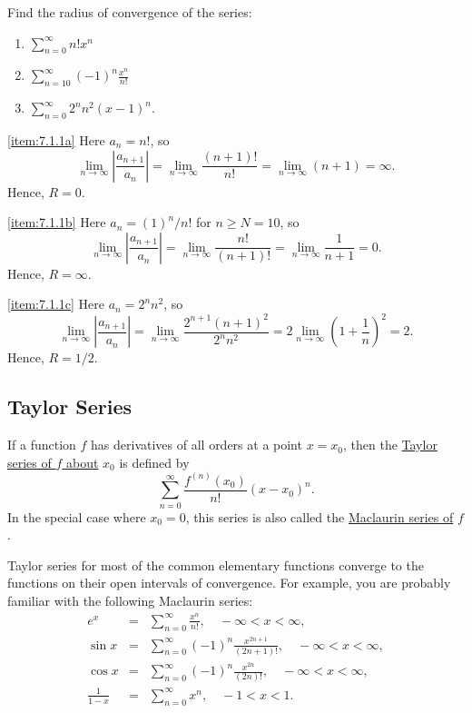 \documentclass{ximera}
\begin{document}
\begin {example} \label{example:7.1.1}
 Find the radius of convergence of the series:
 \begin{enumerate}
\item\label{item:7.1.1a}
$\sum_{n=0}^\infty n!x^n$
\item\label{item:7.1.1b}
$\sum_{n=10}^\infty (-1)^n \frac{x^n}{n!}$
\item\label{item:7.1.1c}
$\sum_{n=0}^\infty 2^nn^2 (x-1)^n.$
\end{enumerate}

\begin{explanation}
\ref{item:7.1.1a}  Here $a_n=n!$, so
$$
\lim_{n\rightarrow\infty}\left|\frac{a_{n+1}}{a_n}\right|=\lim_{n\rightarrow\infty}
\frac{(n+1)!}{n!}=\lim_{n\rightarrow\infty}(n+1)=\infty.
$$
Hence, $R=0$.

\ref{item:7.1.1b}  Here $a_n=(1)^n/n!$ for $n\geq N=10$, so
$$
\lim_{n\rightarrow\infty}\left|\frac{a_{n+1}}{a_n}\right|=\lim_{n\rightarrow\infty}
\frac{n!}{(n+1)!}=\lim_{n\rightarrow\infty}\frac{1}{n+1}=0.
$$
Hence, $R=\infty$.

\ref{item:7.1.1c}  Here $a_n=2^nn^2$, so
$$
\lim_{n\rightarrow\infty}\left|\frac{a_{n+1}}{a_n}\right|=\lim_{n\rightarrow\infty}
\frac{2^{n+1}(n+1)^2}{2^nn^2}=2\lim_{n\rightarrow\infty}\left(1+\frac{1}{n}\right)^2=2.
$$
Hence, $R=1/2$.
\end{explanation}
\end{example}

\subsection*{Taylor Series}

If a function $f$ has derivatives of all orders at a point $x=x_0$,
then the
\href{http://www-history.mcs.st-and.ac.uk/Mathematicians/Taylor.html}{Taylor series of  $f$  about} $x_0$  is
defined by
$$
 \sum_{n=0}^\infty \frac{f^{(n)}(x_0)}{n!}(x-x_0)^n.
$$
In the special case where $x_0=0$, this series is also called the
\href{http://www-history.mcs.st-and.ac.uk/Mathematicians/Maclaurin.html}{Maclaurin series of} $f$.

 Taylor series for most of the common elementary
functions converge to the functions on their open intervals of
convergence. For example, you are probably  familiar with the
following Maclaurin series:
\begin{eqnarray}
e^x&=&\sum_{n=0}^\infty \frac{x^n}{n!},\quad
-\infty<x<\infty,\label{eq:7.1.2}\\
\sin x&=&\sum_{n=0}^\infty(-1)^n \frac{x^{2n+1}}{(2n+1)!},\quad
-\infty<x<\infty, \label{eq:7.1.3}\\ %
\cos x&=&\sum_{n=0}^\infty(-1)^n \frac{x^{2n}}{(2n)!},\quad
-\infty<x<\infty, \label{eq:7.1.4}\\ %
\frac{1}{1-x}&=&\sum_{n=0}^\infty x^n,\quad-1<x<1.\label{eq:7.1.5}
\end{eqnarray}
\end{document}
